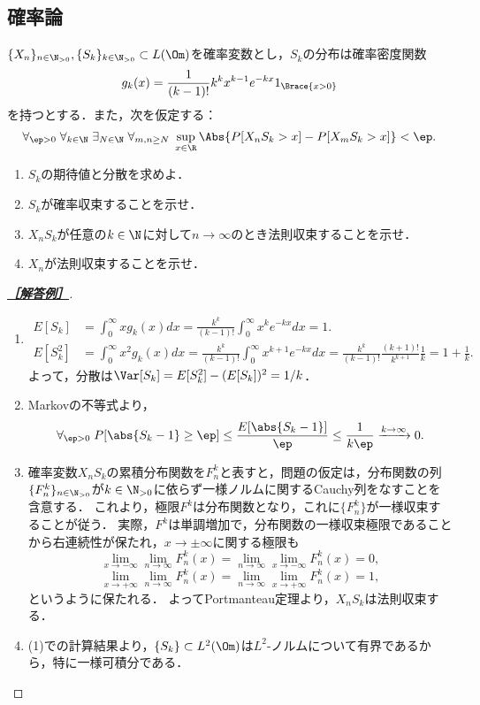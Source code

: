 \documentclass[uplatex,dvipdfmx]{jsarticle}
\begin{document}
\subsection{確率論}

\begin{tcolorbox}[colframe=ForestGreen, colback=ForestGreen!10!white,breakable,colbacktitle=ForestGreen!40!white,coltitle=black,fonttitle=\bfseries\sffamily,
    title=B 第14問（確率論）]
    $\{X_n\}_{n\in\N_{>0}},\{S_k\}_{k\in\N_{>0}}\subset L(\Om)$を確率変数とし，$S_k$の分布は確率密度関数
    \[g_k(x)=\frac{1}{(k-1)!}k^kx^{k-1}e^{-kx}1_{\Brace{x>0}}\]
    を持つとする．また，次を仮定する：
    \[\forall_{\ep>0}\;\forall_{k\in\N}\;\exists_{N\in\N}\;\forall_{m,n\ge N}\;\sup_{x\in\R}\Abs{P[X_nS_k>x]-P[X_mS_k>x]}<\ep.\]
    \begin{enumerate}
        \item $S_k$の期待値と分散を求めよ．
        \item $S_k$が確率収束することを示せ．
        \item $X_nS_k$が任意の$k\in\N$に対して$n\to\infty$のとき法則収束することを示せ．
        \item $X_n$が法則収束することを示せ．
    \end{enumerate}
\end{tcolorbox}
\begin{proof}[\textbf{\underline{［解答例］}}]\mbox{}
    \begin{enumerate}
        \item \begin{align*}
            E[S_k]&=\int^\infty_0xg_k(x)dx=\frac{k^k}{(k-1)!}\int^\infty_0x^ke^{-kx}dx=1.\\
            E[S_k^2]&=\int^\infty_0x^2g_k(x)dx=\frac{k^k}{(k-1)!}\int^\infty_0x^{k+1}e^{-kx}dx=\frac{k^k}{(k-1)!}\frac{(k+1)!}{k^{k+1}}\frac{1}{k}=1+\frac{1}{k}.
        \end{align*}
        よって，分散は$\Var[S_k]=E[S_k^2]-(E[S_k])^2=1/k$．
        \item Markovの不等式より，
        \[\forall_{\ep>0}\;P[\abs{S_k-1}\ge\ep]\le\frac{E[\abs{S_k-1}]}{\ep}\le\frac{1}{k\ep}\xrightarrow{k\to\infty}0.\]
        \item 確率変数$X_nS_k$の累積分布関数を$F_n^k$と表すと，問題の仮定は，分布関数の列$\{F_n^k\}_{n\in\N_{>0}}$が$k\in\N_{>0}$に依らず一様ノルムに関するCauchy列をなすことを含意する．
        これより，極限$F^k$は分布関数となり，これに$\{F_n^k\}$が一様収束することが従う．
        実際，$F^k$は単調増加で，分布関数の一様収束極限であることから右連続性が保たれ，$x\to\pm\infty$に関する極限も
        \[\lim_{x\to-\infty}\lim_{n\to\infty}F_n^k(x)=\lim_{n\to\infty}\lim_{x\to-\infty}F^k_n(x)=0,\]
        \[\lim_{x\to+\infty}\lim_{n\to\infty}F_n^k(x)=\lim_{n\to\infty}\lim_{x\to+\infty}F^k_n(x)=1,\]
        というように保たれる．
        よってPortmanteau定理より，$X_nS_k$は法則収束する．
        \item (1)での計算結果より，$\{S_k\}\subset L^2(\Om)$は$L^2$-ノルムについて有界であるから，特に一様可積分である．
        
    \end{enumerate}
\end{proof}
\end{document}
